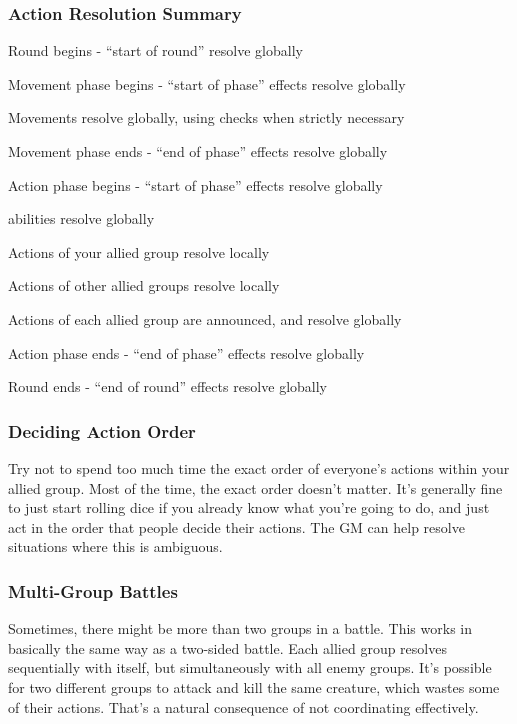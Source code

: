         \subsubsection{Action Resolution Summary} 
            \begin{enumerate*}
                \item Round begins - ``start of round'' resolve globally
                \item Movement phase begins - ``start of phase'' effects resolve globally
                \item Movements resolve globally, using  checks when strictly necessary
                \item Movement phase ends - ``end of phase'' effects resolve globally
                \item Action phase begins - ``start of phase'' effects resolve globally
                \item {} abilities resolve globally
                \item Actions of your allied group resolve locally
                \item Actions of other allied groups resolve locally
                \item Actions of each allied group are announced, and resolve globally
                \item Action phase ends - ``end of phase'' effects resolve globally
                \item Round ends - ``end of round'' effects resolve globally
            \end{enumerate*}

        \subsubsection{Deciding Action Order}\label{Deciding Action Order}
            Try not to spend too much time the exact order of everyone's actions within your allied group.
            Most of the time, the exact order doesn't matter.
            It's generally fine to just start rolling dice if you already know what you're going to do, and just act in the order that people decide their actions.
            The GM can help resolve situations where this is ambiguous.

        \subsubsection{Multi-Group Battles}\label{Multi-Group Battles}
            Sometimes, there might be more than two groups in a battle.
            This works in basically the same way as a two-sided battle.
            Each allied group resolves sequentially with itself, but simultaneously with all enemy groups.
            It's possible for two different groups to attack and kill the same creature, which wastes some of their actions.
            That's a natural consequence of not coordinating effectively.

